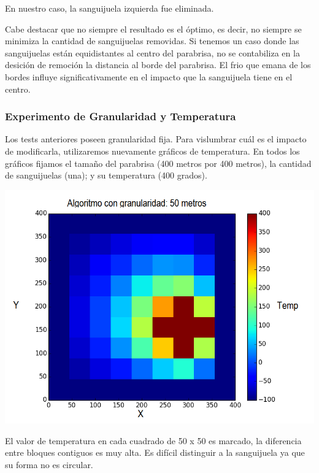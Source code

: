 	En nuestro caso, la sanguijuela izquierda fue eliminada.

	Cabe destacar que no siempre el resultado es el óptimo, es decir, no siempre se minimiza la cantidad de sanguijuelas removidas. Si tenemos un caso donde las sanguijuelas están equidistantes al centro del parabrisa, no se contabiliza en la desición de remoción la distancia al borde del parabrisa. El frio que emana de los bordes influye significativamente en el impacto que la sanguijuela tiene en el centro.

\subsubsection{Experimento de Granularidad y Temperatura}

	Los tests anteriores poseen granularidad fija. Para vislumbrar cuál es el impacto de modificarla, utilizaremos nuevamente gráficos de temperatura. En todos los gráficos fijamos el tamaño del parabrisa (400 metros por 400 metros), la cantidad de sanguijuelas (una); y su temperatura (400 grados).

	\begin{center}
		\includegraphics[scale=0.5]{./img/granularidad/g50_t400_sinkill.png}
	\end{center}

	El valor de temperatura en cada cuadrado de 50 x 50 es marcado, la diferencia entre bloques contiguos es muy alta. Es difícil distinguir a la sanguijuela ya que su forma no es circular.

